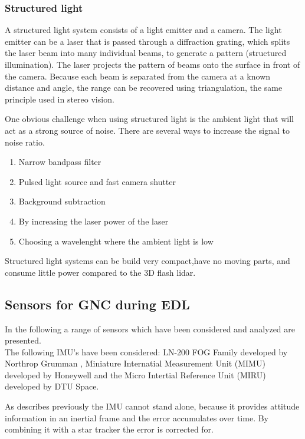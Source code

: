 \subsubsection{Structured light}


A structured light system consists of a light emitter and a camera. The light emitter can be a laser that is passed through a diffraction grating, which splits the laser beam into many individual beams, to generate a pattern (structured illumination). The laser projects the pattern of beams onto the surface in front of the camera. Because each beam is separated from the camera at a known distance and angle, the range can be recovered using triangulation, the same principle used in stereo vision.  \cite{structuredlight}

One obvious challenge when using structured light is the ambient light that will act as a strong source of noise. There are several ways to increase the signal to noise ratio. 

\begin{enumerate}

\item Narrow bandpass filter
\item Pulsed light source and fast camera shutter
\item Background subtraction
\item By increasing the laser power of the laser
\item Choosing a wavelenght where the ambient light is low

\end{enumerate}


Structured light systems can be build very compact,have no moving parts, and consume little power compared to the 3D flash lidar. 


\subsection{Sensors for GNC during EDL}

In the following a range of sensors which have been considered and analyzed are presented. \\

The following IMU's have been considered: 
LN-200 FOG Family developed by Northrop Grumman \cite{LN_200}, Miniature Internatial Measurement Unit (MIMU) developed by Honeywell \cite{mimu} and the Micro Intertial Reference Unit (MIRU) developed by DTU Space.

As describes previously the IMU cannot stand alone, because it provides attitude information in an inertial frame and the error accumulates over time. By combining it with a star tracker the error is corrected for. 


